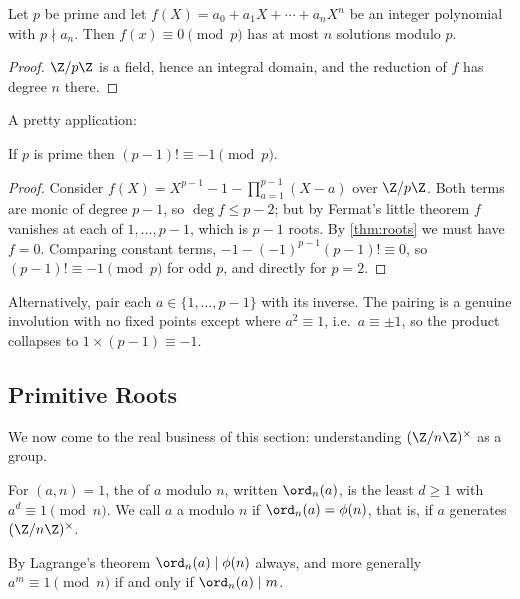 \begin{corollary}[Lagrange]\label{cor:lagrange}
	Let $p$ be prime and let $f(X) = a_0 + a_1 X + \cdots + a_n X^n$ be an integer polynomial with $p \nmid a_n$. Then $f(x) \equiv 0 \pmod p$ has at most $n$ solutions modulo $p$.
\end{corollary}
\begin{proof}
	$\Z/p\Z$ is a field, hence an integral domain, and the reduction of $f$ has degree $n$ there.
\end{proof}

A pretty application:

\begin{theorem}[Wilson]
	If $p$ is prime then $(p-1)! \equiv -1 \pmod p$.
\end{theorem}
\begin{proof}
	Consider $f(X) = X^{p-1} - 1 - \prod_{a=1}^{p-1}(X - a)$ over $\Z/p\Z$. Both terms are monic of degree $p - 1$, so $\deg f \leq p - 2$; but by Fermat's little theorem $f$ vanishes at each of $1, \dots, p-1$, which is $p - 1$ roots. By \autoref{thm:roots} we must have $f = 0$. Comparing constant terms, $-1 - (-1)^{p-1}(p-1)! \equiv 0$, so $(p-1)! \equiv -1 \pmod p$ for odd $p$, and directly for $p = 2$.
\end{proof}

\begin{remark}
	Alternatively, pair each $a \in \{1, \dots, p-1\}$ with its inverse. The pairing is a genuine involution with no fixed points except where $a^2 \equiv 1$, i.e.\ $a \equiv \pm 1$, so the product collapses to $1 \times (p-1) \equiv -1$.
\end{remark}

\subsection{Primitive Roots}

We now come to the real business of this section: understanding $(\Z/n\Z)^\times$ as a group.

\begin{definition}
	For $(a, n) = 1$, the  of $a$ modulo $n$, written $\ord_n(a)$, is the least $d \geq 1$ with $a^d \equiv 1 \pmod n$. We call $a$ a  modulo $n$ if $\ord_n(a) = \phi(n)$, that is, if $a$ generates $(\Z/n\Z)^\times$.
\end{definition}

By Lagrange's theorem $\ord_n(a) \mid \phi(n)$ always, and more generally $a^m \equiv 1 \pmod n$ if and only if $\ord_n(a) \mid m$.

